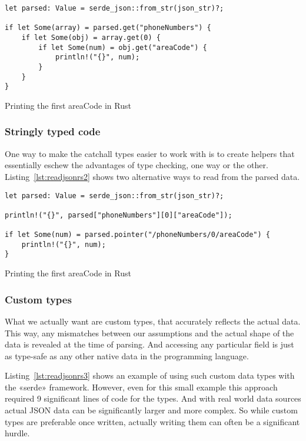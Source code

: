 \begin{listing}[ht!]
\begin{verbatim}
let parsed: Value = serde_json::from_str(json_str)?;

if let Some(array) = parsed.get("phoneNumbers") {
    if let Some(obj) = array.get(0) {
        if let Some(num) = obj.get("areaCode") {
            println!("{}", num);
        }
    }
}
\end{verbatim}
\caption{Printing the first areaCode in Rust}
\label{lst:readjsonrs1}
\end{listing}


\subsubsection{Stringly typed code}

One way to make the catchall types easier to work with is to create helpers that essentially eschew the advantages of type checking, one way or the other. Listing~\ref{lst:readjsonrs2} shows two alternative ways to read from the parsed data. \morestuff

\begin{listing}[ht!]
\begin{verbatim}
let parsed: Value = serde_json::from_str(json_str)?;

println!("{}", parsed["phoneNumbers"][0]["areaCode"]);

if let Some(num) = parsed.pointer("/phoneNumbers/0/areaCode") {
    println!("{}", num);
}
\end{verbatim}
\caption{Printing the first areaCode in Rust}
\label{lst:readjsonrs2}
\end{listing}

\subsubsection{Custom types}

What we actually want are custom types, that accurately reflects the actual data. This way, any mismatches between our assumptions and the actual shape of the data is revealed at the time of parsing. And accessing any particular field is just as type-safe as any other native data in the programming language.

Listing~\ref{lst:readjsonrs3} shows an example of using such custom data types with the «serde» framework. However, even for this small example this approach required 9 significant lines of code for the types. And with real world data sources actual JSON data can be significantly larger and more complex. So while custom types are preferable once written, actually writing them can often be a significant hurdle.

